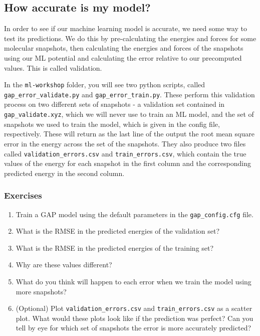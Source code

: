 \documentclass{article}
\begin{document}
\subsection{How accurate is my model?}

In order to see if our machine learning model is accurate, we need some way to test its predictions. We do this by pre-calculating the energies and forces for some molecular snapshots, then calculating the energies and forces of the snapshots using our ML potential and calculating the error relative to our precomputed values. This is called validation.

In the \verb|ml-workshop| folder, you will see two python scripts, called \verb|gap_error_validate.py| and \verb|gap_error_train.py|. These perform this validation process on two different sets of snapshots - a validation set contained in \verb|gap_validate.xyz|, which we will never use to train an ML model, and the set of snapshots we used to train the model, which is given in the config file, respectively. These will return as the last line of the output the root mean square error in the energy across the set of the snapshots. They also produce two files called \verb|validation_errors.csv| and \verb|train_errors.csv|, which contain the true values of the energy for each snapshot in the first column and the corresponding predicted energy in the second column.

\subsubsection*{Exercises}

\begin{enumerate}
 
\item Train a GAP model using the default parameters in the \verb|gap_config.cfg| file.
\item What is the RMSE in the predicted energies of the validation set?
\item What is the RMSE in the predicted energies of the training set?
\item Why are these values different?
\item What do you think will happen to each error when we train the model using more snapshots?
\item (Optional) Plot \verb|validation_errors.csv| and \verb|train_errors.csv| as a scatter plot. What would these plots look like if the prediction was perfect? Can you tell by eye for which set of snapshots the error is more accurately predicted?

\end{enumerate}
\end{document}
